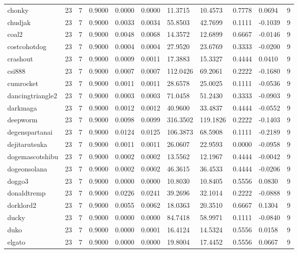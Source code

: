 \begin{table}[htbp]
\begin{tabular}{lllllllllll}
chonky & 23 & 7 & 0.9000 & 0.0000 & 0.0000 & 11.3715 & 10.4573 & 0.7778 & 0.0694 & 9 \\
chudjak & 23 & 7 & 0.9000 & 0.0033 & 0.0034 & 55.8503 & 42.7699 & 0.1111 & -0.1039 & 9 \\
coal2 & 23 & 7 & 0.9000 & 0.0048 & 0.0068 & 14.3572 & 12.6899 & 0.6667 & -0.0146 & 9 \\
costcohotdog & 23 & 7 & 0.9000 & 0.0004 & 0.0004 & 27.9520 & 23.6769 & 0.3333 & -0.0200 & 9 \\
crashout & 23 & 7 & 0.9000 & 0.0009 & 0.0011 & 17.3883 & 15.3327 & 0.4444 & 0.0410 & 9 \\
csi888 & 23 & 7 & 0.9000 & 0.0007 & 0.0007 & 112.0426 & 69.2061 & 0.2222 & -0.1680 & 9 \\
cumrocket & 23 & 7 & 0.9000 & 0.0011 & 0.0011 & 28.6578 & 25.0025 & 0.1111 & -0.0536 & 9 \\
dancingtriangle2 & 23 & 7 & 0.9000 & 0.0003 & 0.0003 & 71.0458 & 51.2430 & 0.3333 & -0.0903 & 9 \\
darkmaga & 23 & 7 & 0.9000 & 0.0012 & 0.0012 & 40.9600 & 33.4837 & 0.4444 & -0.0552 & 9 \\
deepworm & 23 & 7 & 0.9000 & 0.0098 & 0.0099 & 316.3502 & 119.1826 & 0.2222 & -0.1403 & 9 \\
degenspartanai & 23 & 7 & 0.9000 & 0.0124 & 0.0125 & 106.3873 & 68.5908 & 0.1111 & -0.2189 & 9 \\
dejitarutsuka & 23 & 7 & 0.9000 & 0.0011 & 0.0011 & 26.0607 & 22.9593 & 0.0000 & -0.0958 & 9 \\
dogemascotshibu & 23 & 7 & 0.9000 & 0.0002 & 0.0002 & 13.5562 & 12.1967 & 0.4444 & -0.0042 & 9 \\
dogeonsolana & 23 & 7 & 0.9000 & 0.0002 & 0.0002 & 46.3615 & 36.4533 & 0.4444 & -0.0206 & 9 \\
doggo3 & 23 & 7 & 0.9000 & 0.0000 & 0.0000 & 10.8030 & 10.8405 & 0.5556 & 0.0830 & 9 \\
donaldtremp & 23 & 7 & 0.9000 & 0.0226 & 0.0241 & 39.2696 & 32.1014 & 0.2222 & -0.0888 & 9 \\
dorklord2 & 23 & 7 & 0.9000 & 0.0055 & 0.0062 & 18.0363 & 20.3510 & 0.6667 & 0.1304 & 9 \\
ducky & 23 & 7 & 0.9000 & 0.0000 & 0.0000 & 84.7418 & 58.9971 & 0.1111 & -0.0840 & 9 \\
duko & 23 & 7 & 0.9000 & 0.0000 & 0.0001 & 16.4124 & 14.5324 & 0.5556 & 0.0158 & 9 \\
elgato & 23 & 7 & 0.9000 & 0.0000 & 0.0000 & 19.8004 & 17.4452 & 0.5556 & 0.0667 & 9 \\

\end{tabular}
\end{table}
